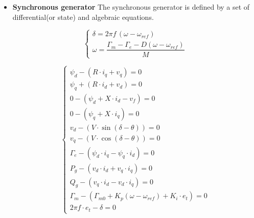 \begin{itemize}
\item \textbf{Synchronous generator}
The synchronous generator is defined by a set of differential(or state) and algebraic equations. 


\begin{equation}
\begin{cases}
\delta = 2\pi f\,(\omega - \omega_{ref}) \\
\omega = \dfrac{\Gamma_m - \Gamma_e - D(\omega - \omega_{ref})}{M}
\end{cases}
\label{eq:diff_eq_gen}
\end{equation}

\begin{equation}
\begin{cases}
\psi_d - (R \cdot i_q + v_q) = 0 \\
\psi_q + (R\cdot i_d + v_d) = 0\\
0 - ( \psi_d + X \cdot i_d - v_f ) = 0\\
0 - (\psi_q + X \cdot i_q) = 0 \\
v_d - (V \cdot \sin(\delta - \theta)) = 0\\
v_q - (V \cdot \cos(\delta - \theta)) = 0\\
\Gamma_e - ( \psi_d \cdot i_q - \psi_q \cdot i_d ) = 0\\
P_g - (v_d \cdot i_d + v_q \cdot i_q) = 0\\
Q_g - (v_q \cdot i_d - v_d \cdot i_q) = 0 \\
\Gamma_m - (\Gamma_{m0} + K_p(\omega - \omega_{ref}) + K_i \cdot e_t) = 0\\
2\pi f \cdot e_t - \delta = 0
\end{cases}
\label{eq:alg_eq_gen}
\end{equation}


\end{itemize}
